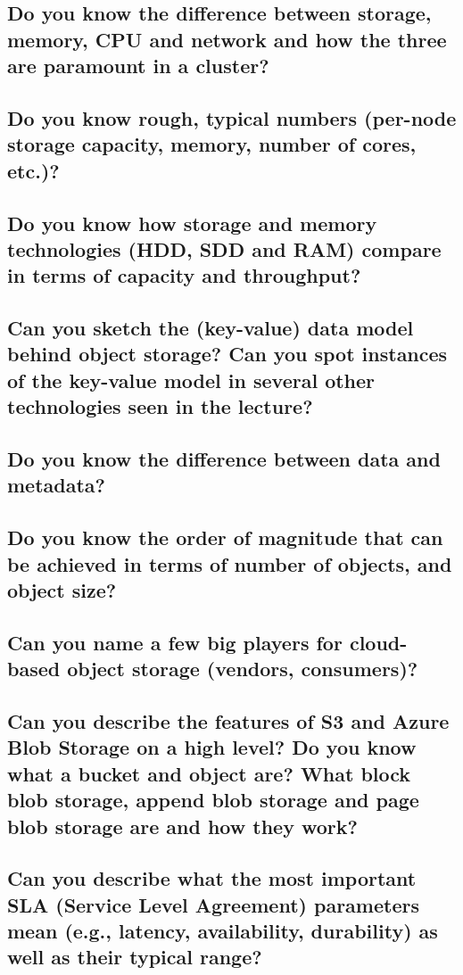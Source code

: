 \documentclass{article}
\begin{document}
\subsection{Do you know the difference between storage, memory, CPU and network and how the three are paramount in a cluster?}
\subsection{Do you know rough, typical numbers (per-node storage capacity, memory, number of cores, etc.)?}
\subsection{Do you know how storage and memory technologies (HDD, SDD and RAM) compare in terms of capacity and throughput?}
\subsection{Can you sketch the (key-value) data model behind object storage? Can you spot instances of the key-value model in several other technologies seen in the lecture?}

\pagebreak

\subsection{Do you know the difference between data and metadata?}
\subsection{Do you know the order of magnitude that can be achieved in terms of number of objects, and object size?}
\subsection{Can you name a few big players for cloud-based object storage (vendors, consumers)?}
\subsection{Can you describe the features of S3 and Azure Blob Storage on a high level? Do you know what a bucket and object are? What block blob storage, append blob storage and page blob storage are and how they work?}
\subsection{Can you describe what the most important SLA (Service Level Agreement) parameters mean (e.g., latency, availability, durability) as well as their typical range?}
\end{document}

